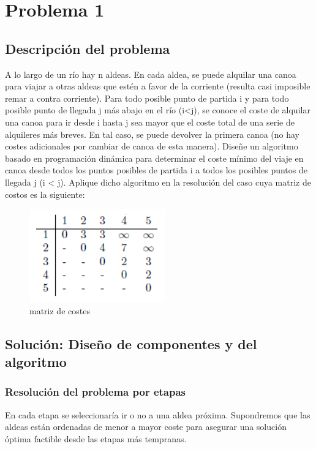 \chapter{Problema 1}

\section{Descripción del problema}
A lo largo de un río hay n aldeas. En cada aldea, se puede alquilar una canoa para viajar a otras aldeas que estén a favor de la corriente (resulta casi imposible remar a contra corriente). Para todo posible punto de partida i y para todo posible punto de llegada j más abajo en el río (i<j), se conoce el coste de alquilar una canoa para ir desde i hasta j sea mayor que el coste total de una serie de alquileres más breves. En tal caso, se puede devolver la primera canoa (no hay costes adicionales por cambiar de canoa de esta manera).
Diseñe un algoritmo basado en programación dinámica para determinar el coste mínimo del viaje en canoa desde todos los puntos posibles de partida i a todos los posibles puntos de llegada j (i < j). Aplique dicho algoritmo en la resolución del caso cuya matriz de costos es la siguiente:
\begin{figure}
    \centering
    \includegraphics{figures/problema1/matriz_costes.png}
    \caption{matriz de costes}
    \label{fig:enter-label}
\end{figure}
\section{Solución: Diseño de componentes y del algoritmo}


\subsection{Resolución del problema por etapas}
En cada etapa se seleccionaría ir o no a una aldea próxima. 
Supondremos que las aldeas están ordenadas de menor a mayor coste para asegurar una solución óptima factible desde las etapas más tempranas.

